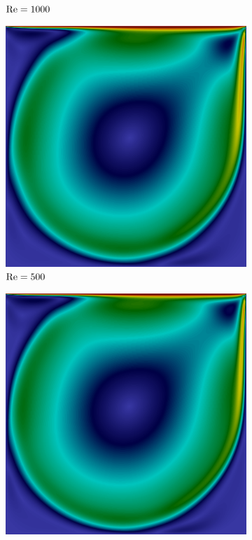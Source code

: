 \begin{figure}[h]
\begin{subfigure}{0.32\textwidth}
    \caption{$\mathrm{Re}=1000$}
    \end{subfigure}
    \begin{subfigure}{0.32\textwidth}
    \includegraphics[width=\linewidth]{Figuras/Cavity/Re5000.png}
    \caption{$\mathrm{Re}=500$}
    \end{subfigure}
    \begin{subfigure}{0.32\textwidth}
    \includegraphics[width=\linewidth]{Figuras/Cavity/Re7500.png}

\end{subfigure}
\end{figure}
